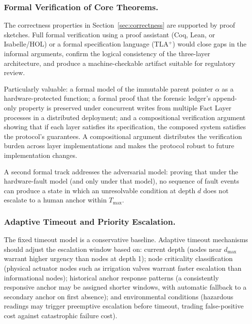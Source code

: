 \subsubsection{Formal Verification of Core Theorems.}
\label{sec:future-formal-verification}

The correctness properties in Section~\ref{sec:correctness} are supported by proof sketches. Full formal verification using a proof assistant (Coq, Lean, or Isabelle/HOL) or a formal specification language (TLA$^+$) would close gaps in the informal arguments, confirm the logical consistency of the three-layer architecture, and produce a machine-checkable artifact suitable for regulatory review.

Particularly valuable: a formal model of the immutable parent pointer $\alpha$ as a hardware-protected function; a formal proof that the forensic ledger's append-only property is preserved under concurrent writes from multiple Fact Layer processes in a distributed deployment; and a compositional verification argument showing that if each layer satisfies its specification, the composed system satisfies the protocol's guarantees. A compositional argument distributes the verification burden across layer implementations and makes the protocol robust to future implementation changes.

A second formal track addresses the adversarial model: proving that under the hardware-fault model (and only under that model), no sequence of fault events can produce a state in which an unresolvable condition at depth $d$ does not escalate to a human anchor within $T_{\max}$.

\subsubsection{Adaptive Timeout and Priority Escalation.}
\label{sec:future-adaptive-timeout}

The fixed timeout model is a conservative baseline. Adaptive timeout mechanisms should adjust the escalation window based on: current depth (nodes near $d_{\max}$ warrant higher urgency than nodes at depth 1); node criticality classification (physical actuator nodes such as irrigation valves warrant faster escalation than informational nodes); historical anchor response patterns (a consistently responsive anchor may be assigned shorter windows, with automatic fallback to a secondary anchor on first absence); and environmental conditions (hazardous readings may trigger preemptive escalation before timeout, trading false-positive cost against catastrophic failure cost).

